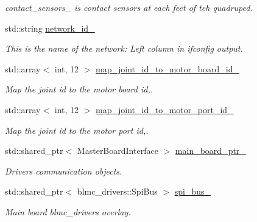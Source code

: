 \begin{DoxyCompactItemize}
\begin{DoxyCompactList}\small\item\em contact\+\_\+sensors\+\_\+ is contact sensors at each feet of teh quadruped. \end{DoxyCompactList}\item 
std\+::string \hyperlink{classblmc__robots_1_1Solo12_aa2fe5722e58645d80641238d1563b371}{network\+\_\+id\+\_\+}\hypertarget{classblmc__robots_1_1Solo12_aa2fe5722e58645d80641238d1563b371}{}\label{classblmc__robots_1_1Solo12_aa2fe5722e58645d80641238d1563b371}

\begin{DoxyCompactList}\small\item\em This is the name of the network\+: Left column in ifconfig output. \end{DoxyCompactList}\item 
std\+::array$<$ int, 12 $>$ \hyperlink{classblmc__robots_1_1Solo12_a783154ba0e9e7a931bc25a2ae17cea37}{map\+\_\+joint\+\_\+id\+\_\+to\+\_\+motor\+\_\+board\+\_\+id\+\_\+}
\begin{DoxyCompactList}\small\item\em Map the joint id to the motor board id,. \end{DoxyCompactList}\item 
std\+::array$<$ int, 12 $>$ \hyperlink{classblmc__robots_1_1Solo12_adc6fc34d0685db1e9a6094474d1db903}{map\+\_\+joint\+\_\+id\+\_\+to\+\_\+motor\+\_\+port\+\_\+id\+\_\+}
\begin{DoxyCompactList}\small\item\em Map the joint id to the motor port id,. \end{DoxyCompactList}\item 
std\+::shared\+\_\+ptr$<$ Master\+Board\+Interface $>$ \hyperlink{classblmc__robots_1_1Solo12_a2675d6567258d0f02d387e228a6e85e1}{main\+\_\+board\+\_\+ptr\+\_\+}
\begin{DoxyCompactList}\small\item\em Drivers communication objects. \end{DoxyCompactList}\item 
std\+::shared\+\_\+ptr$<$ blmc\+\_\+drivers\+::\+Spi\+Bus $>$ \hyperlink{classblmc__robots_1_1Solo12_a416708664f404b0d140e02fe8b90bd00}{spi\+\_\+bus\+\_\+}
\begin{DoxyCompactList}\small\item\em Main board blmc\+\_\+drivers overlay. \end{DoxyCompactList}\item 

\end{DoxyCompactItemize}
